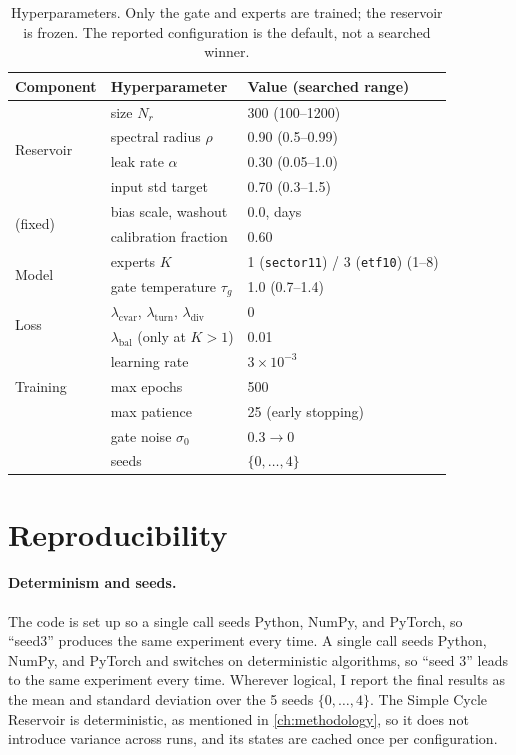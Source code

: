 \begin{table}[t]
  \centering
  \begin{tabular}{lll}
    \hline
    Component & Hyperparameter & Value (searched range) \\
    \hline
    \multirow{4}{*}{Reservoir}
      & size $N_r$              & 300 \;(100--1200) \\
      & spectral radius $\rho$  & 0.90 \;(0.5--0.99) \\
      & leak rate $\alpha$      & 0.30 \;(0.05--1.0) \\
      & input std target        & 0.70 \;(0.3--1.5) \\
    \multirow{2}{*}{(fixed)}
      & bias scale, washout     & 0.0, \; 250 days \\
      & calibration fraction    & 0.60 \\
    \hline
    \multirow{2}{*}{Model}
      & experts $K$             & 1 (\texttt{sector11}) / 3 (\texttt{etf10}) \;(1--8) \\
      & gate temperature $\tau_g$ & 1.0 \;(0.7--1.4) \\
    \hline
    \multirow{2}{*}{Loss}
      & $\lambda_{\text{cvar}}$, $\lambda_{\text{turn}}$, $\lambda_{\text{div}}$ & 0 \\
      & $\lambda_{\text{bal}}$ (only at $K>1$)  & 0.01 \\
    \hline
    \multirow{3}{*}{Training}
      & learning rate & $3\times10^{-3}$ \\
      & max epochs   & 500\\
      & max patience     &  25 (early stopping) \\
      & gate noise $\sigma_0$ & $0.3 \to 0$ \\
      & seeds & $\{0,\dots,4\}$ \\
    \hline
  \end{tabular}
  \caption{Hyperparameters. Only the gate and experts are trained; the reservoir
  is frozen. The reported configuration is the default, not a searched winner.}
  \label{tab:hyper}
\end{table}

\section{Reproducibility}
\label{sec:reproducibility}

\paragraph{Determinism and seeds.} The code is set up so a single call seeds Python, NumPy, and PyTorch, so ``seed3'' produces the same experiment every time.  A single call seeds Python, NumPy, and PyTorch and switches on deterministic algorithms, so ``seed 3'' leads to the same experiment every time. Wherever logical, I report the final results as the mean and standard deviation over the 5 seeds $\{0,\dots,4\}$. The Simple Cycle Reservoir is deterministic, as mentioned in \ref{ch:methodology}, so it does not introduce variance across runs, and its states are cached once per configuration.


